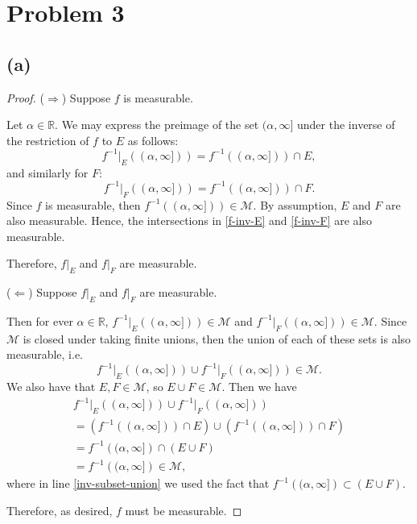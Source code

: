\documentclass{article}
\newcommand{\R}{\mathbb{R}} %
\newcommand{\M}{\mathcal{M}} %
\begin{document}
\section*{Problem 3}
\subsection*{(a)}
\begin{proof}
	($\Rightarrow$) Suppose $f$ is measurable. 
	
	Let $\alpha \in \R$. We may express the preimage of the set $(\alpha, \infty]$ under the inverse of the restriction of $f$ to $E$ as follows:
	\begin{equation}\label{f-inv-E}
		f^{-1}\big|_E \left((\alpha, \infty])\right) = f^{-1}\left((\alpha, \infty])\right) \cap E,
	\end{equation}
	and similarly for $F$:
	\begin{equation}\label{f-inv-F}
		f^{-1}\big|_F \left((\alpha, \infty])\right) = f^{-1}\left((\alpha, \infty])\right) \cap F.
	\end{equation}
	Since $f$ is measurable, then $f^{-1}\left((\alpha, \infty])\right) \in \M$. By assumption, $E$ and $F$ are also measurable. Hence, the intersections in \eqref{f-inv-E} and \eqref{f-inv-F} are also measurable. 
	
	Therefore, $f\big|_E$ and $f\big|_F$ are measurable.
	
	($\Leftarrow$) Suppose $f\big|_E$ and $f\big|_F$ are measurable.
	
	Then for ever $\alpha \in \R$, $f^{-1}\big|_E \left((\alpha, \infty])\right) \in \M$ and $f^{-1}\big|_F \left((\alpha, \infty])\right) \in \M$. Since $\M$ is closed under taking finite unions, then the union of each of these sets is also measurable, i.e.
	\begin{equation}
		f^{-1}\big|_E \left((\alpha, \infty])\right) \cup f^{-1}\big|_F \left((\alpha, \infty])\right) \in \M.
	\end{equation}
	We also have that $E, F \in \M$, so $E \cup F \in \M$. Then we have
	\begin{align}
		f^{-1}\big|_E \left((\alpha, \infty])\right) \cup f^{-1}\big|_F \left((\alpha, \infty])\right) \\= \left(f^{-1}\left((\alpha, \infty])\right) \cap E\right) \cup \left(f^{-1}\left((\alpha, \infty])\right) \cap F\right) \nonumber \\
		= f^{-1}\left((\alpha,\infty]\right) \cap (E \cup F) \\ 
		= f^{-1}\left((\alpha,\infty]\right) \in \M, \label{inv-subset-union}
	\end{align}
	where in line \eqref{inv-subset-union} we used the fact that $f^{-1}\left((\alpha,\infty]\right) \subset (E \cup F)$. 
	
	Therefore, as desired, $f$ must be measurable.
\end{proof}
\end{document}

